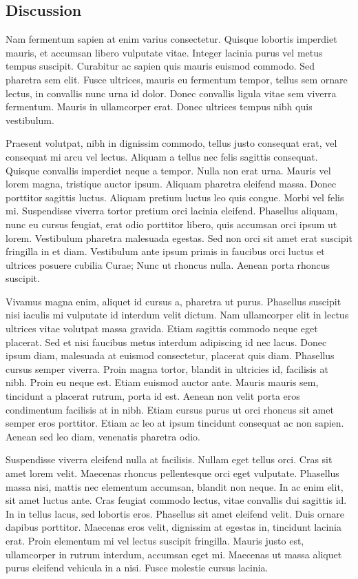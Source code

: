\documentclass[draft, grl]{agutex}
\begin{document}
\begin{article}

\section{Discussion}

Nam fermentum sapien at enim varius consectetur. Quisque lobortis imperdiet mauris, et accumsan libero vulputate vitae. Integer lacinia purus vel metus tempus suscipit. Curabitur ac sapien quis mauris euismod commodo. Sed pharetra sem elit. Fusce ultrices, mauris eu fermentum tempor, tellus sem ornare lectus, in convallis nunc urna id dolor. Donec convallis ligula vitae sem viverra fermentum. Mauris in ullamcorper erat. Donec ultrices tempus nibh quis vestibulum.

Praesent volutpat, nibh in dignissim commodo, tellus justo consequat erat, vel consequat mi arcu vel lectus. Aliquam a tellus nec felis sagittis consequat. Quisque convallis imperdiet neque a tempor. Nulla non erat urna. Mauris vel lorem magna, tristique auctor ipsum. Aliquam pharetra eleifend massa. Donec porttitor sagittis luctus. Aliquam pretium luctus leo quis congue. Morbi vel felis mi. Suspendisse viverra tortor pretium orci lacinia eleifend. Phasellus aliquam, nunc eu cursus feugiat, erat odio porttitor libero, quis accumsan orci ipsum ut lorem. Vestibulum pharetra malesuada egestas. Sed non orci sit amet erat suscipit fringilla in et diam. Vestibulum ante ipsum primis in faucibus orci luctus et ultrices posuere cubilia Curae; Nunc ut rhoncus nulla. Aenean porta rhoncus suscipit.

Vivamus magna enim, aliquet id cursus a, pharetra ut purus. Phasellus suscipit nisi iaculis mi vulputate id interdum velit dictum. Nam ullamcorper elit in lectus ultrices vitae volutpat massa gravida. Etiam sagittis commodo neque eget placerat. Sed et nisi faucibus metus interdum adipiscing id nec lacus. Donec ipsum diam, malesuada at euismod consectetur, placerat quis diam. Phasellus cursus semper viverra. Proin magna tortor, blandit in ultricies id, facilisis at nibh. Proin eu neque est. Etiam euismod auctor ante. Mauris mauris sem, tincidunt a placerat rutrum, porta id est. Aenean non velit porta eros condimentum facilisis at in nibh. Etiam cursus purus ut orci rhoncus sit amet semper eros porttitor. Etiam ac leo at ipsum tincidunt consequat ac non sapien. Aenean sed leo diam, venenatis pharetra odio.

Suspendisse viverra eleifend nulla at facilisis. Nullam eget tellus orci. Cras sit amet lorem velit. Maecenas rhoncus pellentesque orci eget vulputate. Phasellus massa nisi, mattis nec elementum accumsan, blandit non neque. In ac enim elit, sit amet luctus ante. Cras feugiat commodo lectus, vitae convallis dui sagittis id. In in tellus lacus, sed lobortis eros. Phasellus sit amet eleifend velit. Duis ornare dapibus porttitor. Maecenas eros velit, dignissim at egestas in, tincidunt lacinia erat. Proin elementum mi vel lectus suscipit fringilla. Mauris justo est, ullamcorper in rutrum interdum, accumsan eget mi. Maecenas ut massa aliquet purus eleifend vehicula in a nisi. Fusce molestie cursus lacinia.


\end{article}
\end{document}
